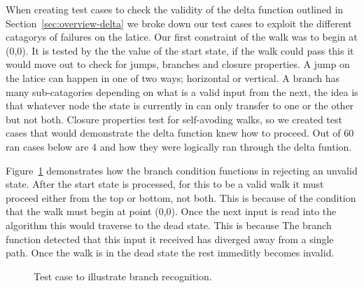 When creating test cases to check the validity of the delta function outlined in Section~\ref{sec:overview-delta} we broke down our test cases to exploit the different catagorys of failures on the latice.  Our first constraint of the walk was to begin at (0,0). It is  tested by the the value of the start state, if the walk could pass this it would move out to check for jumps, branches and closure properties. A jump on the latice can happen in one of two ways; horizontal or vertical. A branch has many sub-catagories depending on what is a valid input from the next, the idea is that whatever node the state is currently in can only transfer to one or the other but not both. Closure properties test for self-avoding walks, so we created test cases that would demonstrate the delta function knew how to proceed. Out of 60 ran cases below are 4 and how they were logically ran through the delta funtion. 

Figure~\ref{fig:test-branch} demonstrates how the branch condition functions in rejecting an unvalid state. After the start state is processed, for this to be a valid walk it must proceed either from the top or bottom, not both. This is because of the condition that the walk must begin at point (0,0). Once the next input is read into the algorithm this would traverse to the dead state. This is because The branch function detected that this input it received has diverged away from a single path. Once the walk is in the dead state the rest immeditly becomes invalid.
\begin{figure}[h!]
\begin{center}
\end{center}
\caption{Test case to illustrate branch recognition.}
\label{fig:test-branch}
\end{figure}

